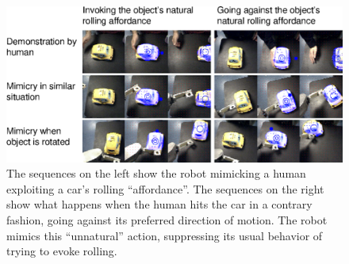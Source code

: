 \begin{figure}[tb]
\begin{center}
\includegraphics[width=\columnwidth]{fig-mimicry-awkward.eps}
\caption{ 
\label{fig:mimicked-action}
%
%
The sequences on the left show the robot mimicking a human exploiting
a car's rolling ``affordance''.  The sequences on the right show
what happens when the human hits the car in a contrary fashion, going
against its preferred direction of motion.  The robot mimics this 
``unnatural'' action, suppressing its usual behavior of trying to
evoke rolling.
%
}
\end{center}
\end{figure}

